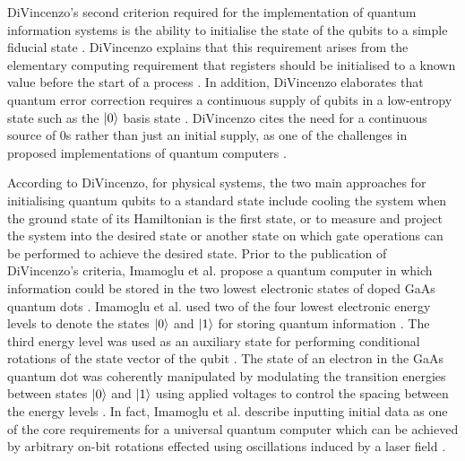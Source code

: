 DiVincenzo's second criterion required for the implementation of quantum information systems is the ability to initialise the state of the qubits to a simple \gls{fiducial state} \cite{divincenzo2000physical}. DiVincenzo explains that this requirement arises from the elementary computing requirement that registers should be initialised to a known value before the start of a process \cite{divincenzo2000physical}. In addition, DiVincenzo elaborates that quantum error correction requires a continuous supply of qubits in a low-entropy state such as the $\ket{0}$ basis state \cite{divincenzo2000physical}. DiVincenzo cites the need for a continuous source of 0s rather than just an initial supply, as one of the challenges in proposed implementations of quantum computers \cite{divincenzo2000physical}. 

According to DiVincenzo, for physical systems, the two main approaches for initialising quantum qubits to a standard state include cooling the system when the ground state of its Hamiltonian is the first state, or to measure and project the system into the desired state or another state on which gate operations can be performed to achieve the desired state. Prior to the publication of DiVincenzo's criteria, Imamoglu et al. propose a quantum computer in which information could be stored in the two lowest electronic states of doped GaAs quantum dots \cite{sherwin1999quantum}. Imamoglu et al. used two of the four lowest electronic energy levels to denote the states $\ket{0}$ and $\ket{1}$ for storing quantum information \cite{sherwin1999quantum}. The third energy level was used as an auxiliary state for performing conditional rotations of the state vector of the qubit \cite{sherwin1999quantum}. The state of an electron in the GaAs quantum dot was coherently manipulated by modulating the transition energies between states $\ket{0}$ and $\ket{1}$ using applied voltages to control the spacing between the energy levels \cite{sherwin1999quantum}. In fact, Imamoglu et al. describe inputting initial data as one of the core requirements for a universal quantum computer which can be achieved by arbitrary on-bit rotations effected using oscillations induced by a laser field \cite{sherwin1999quantum}.


